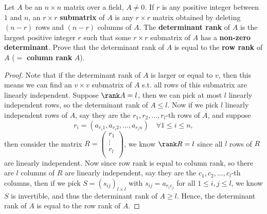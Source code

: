\begin{problem}
Let $A$ be an $n \times n$ matrix over a field, $A \ne 0$. If $r$ is any positive integer between $1$ and $n$, an $r \times r$ \textbf{submatrix} of $A$ is any $r \times r$ matrix obtained by deleting $(n-r)$ rows and $(n-r)$ columns of $A$. The \textbf{determinant rank} of $A$ is the largest positive integer $r$ such that some $r \times r$ submatrix of $A$ has a \textbf{non-zero determinant}. Prove that the determinant rank of $A$ is equal to the \textbf{row rank} of $A$ ($=$ \textbf{column rank} $A$).
\end{problem}
\begin{proof}
    Note that if the determinant rank of \(A\) is larger or equal to \(v\), then this means we can find an \(v \times v\) submatrix of \(A\) s.t. all rows of this submatrix are linearly independent. Suppose \(\rank A = l\), then we can pick at most \(l\) linearly independent rows, so the determinant rank of \(A \le l\). Now if we pick \(l\) linearly independent rows of \(A\), say they are the \(r_1, r_2, \dots , r_l\)-th rows of \(A\), and suppose 
    \[
        r_i = (a_{r_i 1 }, a_{r_i 2}, \dots , a_{r_i n}) \quad \forall 1 \le i \le n,
    \] then consider the matrix \(R = \begin{pmatrix}
         r_1 \\
         \vdots \\
         r_l \\
    \end{pmatrix}\), we know \(\rank R = l\) since all \(l\) rows of \(R\) are linearly independent. Now since row rank is equal to column rank, so there are \(l\) columns of \(R\) are linearly independent, say they are the \(c_1, c_2, \dots , c_l\)-th columns, then if we pick \(S = (s_{ij})_{l \times l}\) with \(s_{ij} = a_{r_i c_j}\) for all \(1 \le i,j \le l\), we know \(S\) is invertible, and thus the determinant rank of \(A \ge l\). Hence, the determinant rank of \(A\) is equal to the row rank of \(A\).             
\end{proof}

